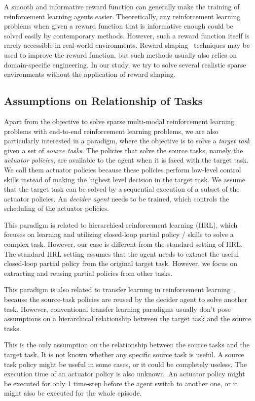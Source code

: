 A smooth and informative reward function can generally make the training of reinforcement learning agents easier. Theoretically, any reinforcement learning problems when given a reward function that is informative enough could be solved easily by contemporary methods. However, such a reward function itself is rarely accessible in real-world environments. Reward shaping~\cite{ng1999policy} techniques may be used to improve the reward function, but such methods usually also relies on domain-specific engineering. In our study, we try to solve several realistic sparse environments without the application of reward shaping.


\subsection{Assumptions on Relationship of Tasks}
Apart from the objective to solve sparse multi-modal reinforcement learning problems with end-to-end reinforcement learning problems, we are also particularly interested in a paradigm, where the objective is to solve a \textit{target task } given a set of \textit{source tasks}. The policies that solve the source tasks, namely the \textit{actuator policies}, are available to the agent when it is faced with the target task. We call them actuator policies because these policies perform low-level control skills instead of making the highest level decision in the target task. We assume that the target task can be solved by a sequential execution of a subset of the actuator policies. An \textit{decider agent} needs to be trained, which controls the scheduling of the actuator policies.

This paradigm is related to hierarchical reinforcement learning (HRL), which focuses on learning and utilizing closed-loop partial policy / skills to solve a complex task. However, our case is different from the standard setting of HRL. The standard HRL setting assumes that the agent needs to extract the useful closed-loop partial policy from the original target task. However, we focus on extracting and reusing partial policies from other tasks.

This paradigm is also related to transfer learning in reinforcement learning~\cite{taylor2009transfer}, because the source-task policies are reused by the decider agent to solve another task. However, conventional transfer learning paradigms usually don't pose assumptions on a hierarchical relationship between the target task and the source tasks.

This is the only assumption on the relationship between the source tasks and the target task. It is not known whether any specific source task is useful. A source task policy might be useful in some cases, or it could be completely useless. The execution time of an actuator policy is also unknown. An actuator policy might be executed for only 1 time-step before the agent switch to another one, or it might also be executed for the whole episode.

